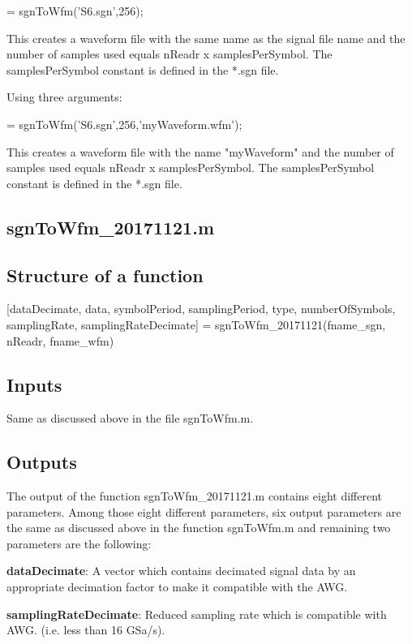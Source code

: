 \bigskip

 = sgnToWfm('S6.sgn',256);
\bigskip

\noindent
This creates a waveform file with the same name as the signal file name and the number of samples used equals nReadr x samplesPerSymbol. The samplesPerSymbol constant is 	defined in the *.sgn file.
\bigskip

\noindent
Using three arguments:

\bigskip

 = sgnToWfm('S6.sgn',256,'myWaveform.wfm');
\bigskip

\noindent
This creates a waveform file with the name "myWaveform" and the number of samples used equals nReadr x samplesPerSymbol. The samplesPerSymbol constant is defined in the *.sgn file.

\subsection{sgnToWfm\_20171121.m}

\subsection*{Structure of a function}
[dataDecimate, data, symbolPeriod, samplingPeriod, type, numberOfSymbols, samplingRate, samplingRateDecimate]  = sgnToWfm\_20171121(fname\_sgn, nReadr, fname\_wfm)

\subsection*{Inputs}
Same as discussed above in the file sgnToWfm.m.


\subsection*{Outputs}
The output of the function sgnToWfm\_20171121.m contains eight different parameters. Among those eight different parameters, six output parameters are the same as discussed above in the function sgnToWfm.m and remaining two parameters are the following:
\bigskip

\textbf{dataDecimate}: A vector which contains decimated signal data by an appropriate decimation factor to make it compatible with the AWG.
\bigskip	

\textbf{samplingRateDecimate}: Reduced sampling rate which is compatible with AWG. (i.e. less than 16 GSa/s).

